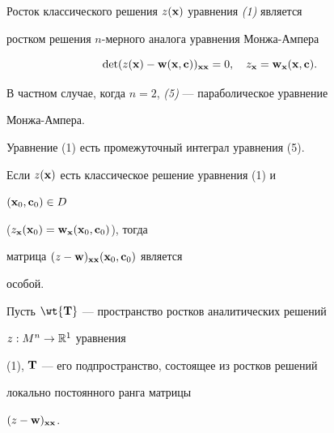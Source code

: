 \begin{lem}


Росток классического решения $z(\bold x)$ уравнения {\em (1)} является


ростком решения $n$-мерного аналога уравнения Монжа-Ампера


\begin{equation}


\det(z(\bold x)-\bold w(\bold x,\bold c))_{\bold x\bold x}=0,


\quad z_{\bold x}=\bold w_{\bold x}(\bold x,\bold c).


\end{equation}


В частном случае, когда $n=2$, {\em (5)} --- параболическое уравнение


Монжа-Ампера.


\end{lem}





\begin{cor}


Уравнение (1) есть промежуточный интеграл уравнения (5).


\end{cor}





\begin{cor}


Если $z(\bold x)$ есть классическое решение уравнения (1) и


$(\bold x_0,\bold c_0)\in D$


($z_{\bold x}(\bold x_0)=\bold w_{\bold x}(\bold x_0,\bold c_0)$), тогда


матрица $(z-\bold w)_{\bold x\bold x}(\bold x_0,\bold c_0)$ является


особой.


\end{cor}





Пусть $\wt{\bold T}$ --- пространство ростков аналитических решений


$z:M^n\to\Bbb R^1$ уравнения


(1), $\bold T$ --- его подпространство, состоящее из ростков решений


локально постоянного ранга матрицы


$(z-\bold w)_{\bold x\bold x}$.





